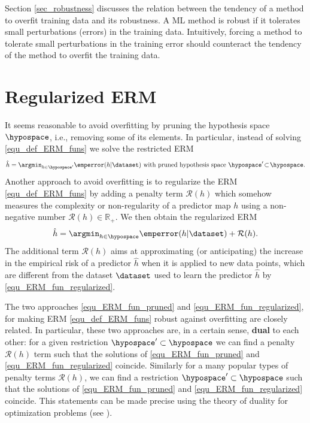 \documentclass[12pt]{report}
\begin{document}
Section \ref{sec_robustness} discusses the relation between 
the tendency of a method to overfit training data and its robustness. 
A ML method is robust if it tolerates small perturbations (errors) 
in the training data. Intuitively, forcing a method to tolerate small 
perturbations in the training error should counteract the tendency 
of the method to overfit the training data. 

\section{Regularized ERM} 
It seems reasonable to avoid overfitting by pruning the 
hypothesis space $\hypospace$, i.e., removing some of 
its elements. In particular, instead of solving \eqref{equ_def_ERM_funs} 
we solve the restricted ERM 
\begin{equation}
\label{equ_ERM_fun_pruned}
   \hat{h} = \argmin_{h \in \hypospace'} \emperror(h|\dataset) \mbox{ with pruned hypothesis space } \hypospace' \!\subset\!\hypospace. 
\end{equation}
Another approach to avoid overfitting is to regularize the ERM \eqref{equ_def_ERM_funs} 
by adding a penalty term $\mathcal{R}(h)$ which somehow measures the complexity or 
non-regularity of a predictor map $h$ using a non-negative number $\mathcal{R}(h) \in \mathbb{R}_{+}$. 
We then obtain the regularized ERM 
\begin{equation}
\label{equ_ERM_fun_regularized}
  \hat{h} = \argmin_{h \in \hypospace} \emperror(h|\dataset)  + \mathcal{R}(h). 
\end{equation} 
The additional term $\mathcal{R}(h)$ aims at approximating 
(or anticipating) the increase in the empirical risk of a predictor 
$\hat{h}$ when it is applied to new data points, which are 
different from the dataset $\dataset$ used to learn the 
predictor $\hat{h}$ by \eqref{equ_ERM_fun_regularized}. 

The two approaches \eqref{equ_ERM_fun_pruned} and \eqref{equ_ERM_fun_regularized}, for 
making ERM \eqref{equ_def_ERM_funs} robust against overfitting are closely related. In particular, 
these two approaches are, in a certain sense, {\bf dual} to each other: for a given restriction 
$\hypospace' \subset \hypospace$ we can find a penalty $\mathcal{R}(h)$ term such that the 
solutions of \eqref{equ_ERM_fun_pruned} and \eqref{equ_ERM_fun_regularized} coincide. Similarly 
for a many popular types of penalty terms $\mathcal{R}(h)$, we can find a restriction $\hypospace' \subset \hypospace$ 
such that the solutions of \eqref{equ_ERM_fun_pruned} and \eqref{equ_ERM_fun_regularized} coincide. 
This statements can be made precise using the theory of duality for optimization problems (see \cite{BertsekasNonLinProgr}). 
\end{document}
